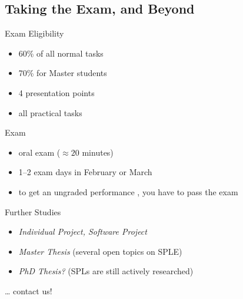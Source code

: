 \subsection{Taking the Exam, and Beyond}

\begin{frame}{\myframetitle}
	\begin{fancycolumns}
		\begin{definition}{Exam Eligibility }
			\begin{itemize}
				\item 60\% of all normal tasks 
				\item 70\% for Master students
				\item 4 presentation points 
				\item all practical tasks
			\end{itemize}
		\end{definition}
	\nextcolumn
		\begin{definition}{Exam}
			\begin{itemize}
				\item oral exam ($\approx 20$ minutes)
				\item 1--2 exam days in February or March
				\item to get an ungraded performance , you have to pass the exam
			\end{itemize}
		\end{definition}
		\begin{example}{Further Studies}
			\begin{itemize}
				\item \emph{Individual Project, Software Project}
				\item \emph{Master Thesis} (several open topics on SPLE)
				\item \emph{PhD Thesis?} (SPLs are still actively researched)
			\end{itemize}
			\ldots{} contact us!
		\end{example}
	\end{fancycolumns}
\end{frame}
